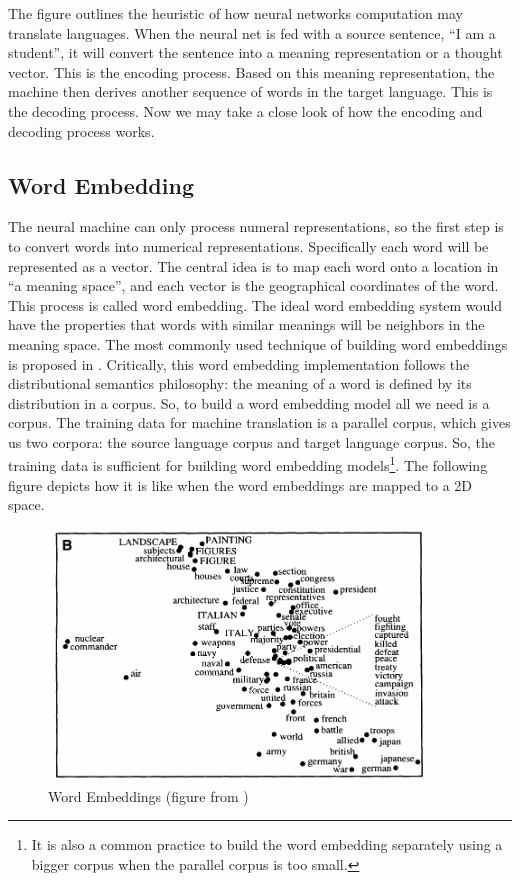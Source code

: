 \documentclass[final]{ua-thesis}
\numberwithin{equation}{section}
\begin{document}
The figure outlines the heuristic of how neural networks computation may translate languages. When the neural net is fed with a source sentence, ``I am a student'', it will convert the sentence into a meaning representation or a thought vector. This is the encoding process. Based on this meaning representation, the machine then derives another sequence of words in the target language. This is the decoding process. Now we may take a close look of how the encoding and decoding process works. 

\subsection{Word Embedding}
The neural machine can only process numeral representations, so the first step is to convert words into numerical representations. Specifically each word will be represented as a vector. The central idea is to map each word onto a location in ``a meaning space'', and each vector is the geographical coordinates of the word. 
This process is called word embedding. The ideal word embedding system would have the properties that words with similar meanings will be neighbors in the meaning space. 
The most commonly used technique of building word embeddings is proposed in \citet{mikolov2013efficient, mikolov2013distributed}. Critically, this word embedding implementation follows the distributional semantics philosophy: the meaning of a word is defined by its distribution in a corpus. So, to build a word embedding model all we need is a corpus. The training data for machine translation is a parallel corpus, which gives us two corpora: the source language corpus and target language corpus. So, the training data is sufficient for building word embedding models\footnote{It is also a common practice to build the word embedding separately using a bigger corpus when the parallel corpus is too small.}. The following figure depicts how it is like when the word embeddings are mapped to a 2D space.   

\begin{figure}
\caption{Word Embeddings (figure from \citet{roweis2000nonlinear})}
\centering
\includegraphics[width=0.9\textwidth]{word_emb.png}
\end{figure} 
\end{document}
